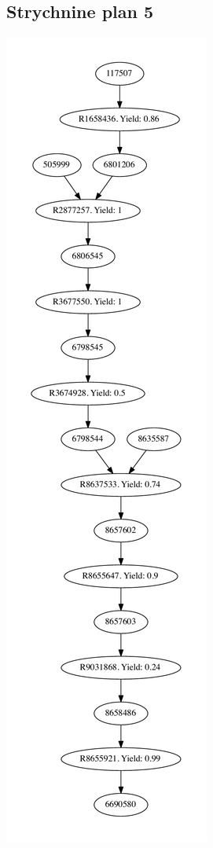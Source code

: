 \documentclass[a4paper,10pt,titlepage]{paper}
\begin{document}
\subsection{Strychnine plan 5}
\centering
\includegraphics[scale=0.4]{Synteseplaner/Strychnine/plan5.pdf}
\label{Appendix::Strychnine5}
\end{document}
